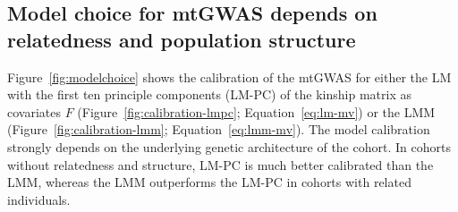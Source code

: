  
 \subsection{Model choice for mtGWAS depends on relatedness and population structure}
 \label{ssection:modelchoice}
Figure~\ref{fig:modelchoice} shows the calibration of the mtGWAS for either the LM with the first ten principle components (LM-PC) of the kinship matrix as covariates \(F\) (Figure~\ref{fig:calibration-lmpc}; Equation~\ref{eq:lm-mv}) or the LMM  (Figure~\ref{fig:calibration-lmm}; Equation~\ref{eq:lmm-mv}). The model calibration strongly depends on the underlying genetic architecture of the cohort. In cohorts without relatedness and structure,  LM-PC is much better calibrated than the LMM, whereas the LMM outperforms the LM-PC in cohorts with related individuals.

